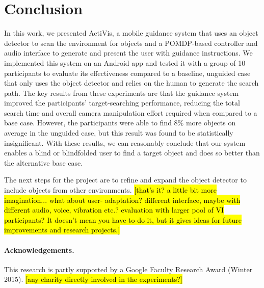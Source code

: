 \documentclass[runningheads]{llncs}
\DeclareRobustCommand{\tofix}[1]{{\sethlcolor{yellow}\hl{[#1]}}}
\begin{document}

\section{Conclusion}\label{sec:conclusion}

In this work, we presented ActiVis, a mobile guidance system that uses an object detector to scan the environment for objects and a POMDP-based controller and audio interface to generate and present the user with guidance instructions. 
We implemented this system on an Android app and tested it with a group of 10 participants to evaluate its effectiveness compared to a baseline, unguided case that only uses the object detector and relies on the human to generate the search path. 
The key results from these experiments are that the guidance system improved the participants' target-searching performance, reducing the total search time and overall camera manipulation effort required when compared to a base case.
However, the participants were able to find 8\% more objects on average in the unguided case, but this result was found to be statistically insignificant. 
With these results, we can reasonably conclude that our system enables a blind or blindfolded user to find a target object and does so better than the alternative base case.

The next steps for the project are to refine and expand the object detector to include objects from other environments. \tofix{that's it? a little bit more imagination... what about user- adaptation? different interface, maybe with different audio, voice, vibration etc.? evaluation with larger pool of VI participants? It doesn't mean you have to do it, but it gives ideas for future improvements and research projects.}

\paragraph{{\bf Acknowledgements.}}\label{sec:acknowledge}
This research is partly supported by a Google Faculty Research Award (Winter 2015).
\tofix{any charity directly involved in the experiments?}




\end{document}
